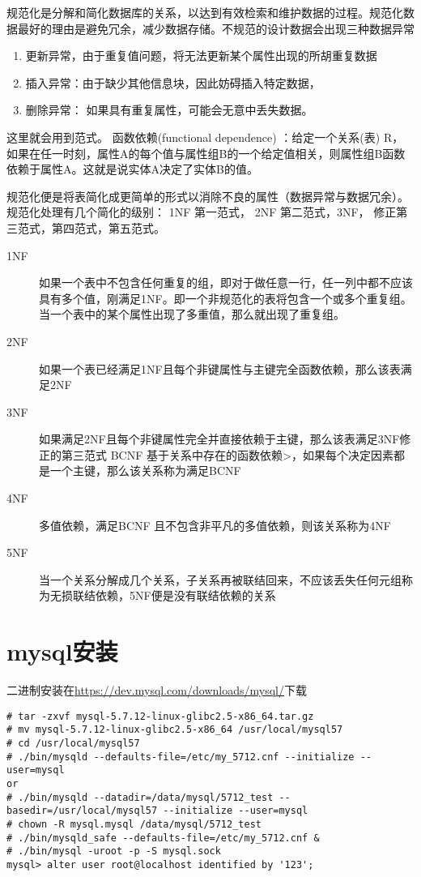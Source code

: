 规范化是分解和简化数据库的关系，以达到有效检索和维护数据的过程。规范化数据最好的理由是避免冗余，减少数据存储。不规范的设计数据会出现三种数据异常
\begin{enumerate}
	\item  更新异常，由于重复值问题，将无法更新某个属性出现的所胡重复数据
	\item  插入异常：由于缺少其他信息块，因此妨碍插入特定数据，
	\item  删除异常： 如果具有重复属性，可能会无意中丢失数据。
\end{enumerate}

这里就会用到范式。
函数依赖(functional dependence) ：给定一个关系(表) R，如果在任一时刻，属性A的每个值与属性组B的一个给定值相关，则属性组B函数依赖于属性A。这就是说实体A决定了实体B的值。

规范化便是将表简化成更简单的形式以消除不良的属性（数据异常与数据冗余）。规范化处理有几个简化的级别： 1NF 第一范式， 2NF 第二范式，3NF， 修正第三范式，第四范式，第五范式。
\begin{description}
	\item[1NF] 如果一个表中不包含任何重复的组，即对于做任意一行，任一列中都不应该具有多个值，刚满足1NF。即一个非规范化的表将包含一个或多个重复组。当一个表中的某个属性出现了多重值，那么就出现了重复组。
\item[2NF] 如果一个表已经满足1NF且每个非键属性与主键完全函数依赖，那么该表满足2NF
\item[3NF] 如果满足2NF且每个非键属性完全并直接依赖于主键，那么该表满足3NF修正的第三范式 BCNF 基于关系中存在的函数依赖>，如果每个决定因素都是一个主键，那么该关系称为满足BCNF
\item[4NF] 多值依赖，满足BCNF 且不包含非平凡的多值依赖，则该关系称为4NF
\item[5NF] 当一个关系分解成几个关系，子关系再被联结回来，不应该丢失任何元组称为无损联结依赖，5NF便是没有联结依赖的关系
\end{description}



\section{mysql安装}
二进制安装在\url{https://dev.mysql.com/downloads/mysql/}下载

\begin{lstlisting}
# tar -zxvf mysql-5.7.12-linux-glibc2.5-x86_64.tar.gz
# mv mysql-5.7.12-linux-glibc2.5-x86_64 /usr/local/mysql57
# cd /usr/local/mysql57
# ./bin/mysqld --defaults-file=/etc/my_5712.cnf --initialize --user=mysql
or
# ./bin/mysqld --datadir=/data/mysql/5712_test --basedir=/usr/local/mysql57 --initialize --user=mysql
# chown -R mysql.mysql /data/mysql/5712_test
# ./bin/mysqld_safe --defaults-file=/etc/my_5712.cnf &
# ./bin/mysql -uroot -p -S mysql.sock
mysql> alter user root@localhost identified by '123';
\end{lstlisting}

